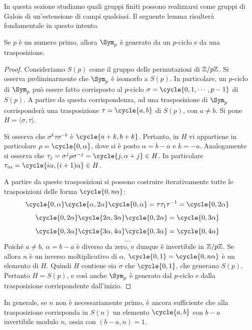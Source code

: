 \documentclass[11pt]{scrartcl}
\begin{document}
	In questa sezione studiamo quali gruppi finiti possono realizzarsi come gruppi di 
	Galois di un'estensione di campi qualsiasi. Il seguente lemma risulterà
	fondamentale in questo intento. 
	
	\begin{lemma}
		\label{lemma3.18}
		Se $p$ è un numero primo, allora $\Sym_p$ è generato da un $p$-ciclo e da una trasposizione.
	\end{lemma}
	
	\begin{proof}
		Consideriamo $S(p)$ come il gruppo delle permutazioni di $\mathbb{Z}/{p}\mathbb{Z}$. Si osserva preliminarmente
		che $\Sym_p$ è isomorfo a $S(p)$. In particolare, un $p$-ciclo di $\Sym_p$ può essere fatto
		corrisposto al $p$-ciclo $\sigma = \cycle{0, 1, \cdots, p-1}$
		di $S(p)$. A partire da questa corrispondenza, ad una trasposizione di $\Sym_p$ corrisponderà
		una trasposizione $\tau = \cycle{a, b}$ di $S(p)$, con $a \neq b$. Si pone $H = \langle \sigma, \tau \rangle$. \medskip
		
		
		Si osserva che $\sigma^k \tau \sigma^{-k}$ è $\cycle{a+k, b+k}$. Pertanto, in
		$H$ vi appartiene in particolare $\rho = \cycle{0, \alpha}$, dove si è posto
		$\alpha = b-a$ e $k = -a$.
		Analogamente si osserva che $\tau_j = \sigma^j \rho \sigma^{-j} = \cycle{j, \alpha + j} \in H$. In
		particolare $\tau_{i \alpha} = \cycle{i \alpha, (i+1) \alpha} \in H$. \medskip
		
		
		A partire da queste trasposizioni si possono costruire iterativamente tutte le trasposizioni
		delle forma $\cycle{0, n\alpha}$:
		\[
		\cycle{0, \alpha}\cycle{\alpha, 2\alpha}\cycle{0, \alpha} = \tau \tau_{1} \tau\inv = \cycle{0, 2\alpha}
		\]
		\[
		\cycle{0, 2\alpha}\cycle{2\alpha, 3\alpha}\cycle{0, 2\alpha} = \cycle{0, 3\alpha}
		\]
		\[
		\cycle{0, 3\alpha}\cycle{3\alpha, 4\alpha}\cycle{0, 3\alpha} = \cycle{0, 4\alpha}
		\]
		\[ \ldots \]
		 Poiché $a \neq b$, $\alpha = b - a$ è
		diverso da zero, e dunque è invertibile in $\mathbb{Z}/{p}\mathbb{Z}$. Se allora $n$ è un inverso moltiplicativo
		di $\alpha$, $\cycle{0, 1} = \cycle{0, n \alpha}$ è un elemento di $H$.
		Quindi $H$ contiene sia $\sigma$ che $\cycle{0, 1}$, che generano $S(p)$. Pertanto $H = S(p)$,
		e così anche $\Sym_p$ è generato dal $p$-ciclo e dalla trasposizione corrispondente dall'inizio.
	\end{proof}
	
	\begin{remark}
		In generale, se $n$ non è necessariamente primo, è ancora sufficiente che alla trasposizione
		corrisponda in $S(n)$ un elemento $\cycle{a, b}$ con $b-a$ invertibile modulo $n$, ossia
		con $(b-a, n) = 1$. 
	\end{remark}
	
\end{document}
